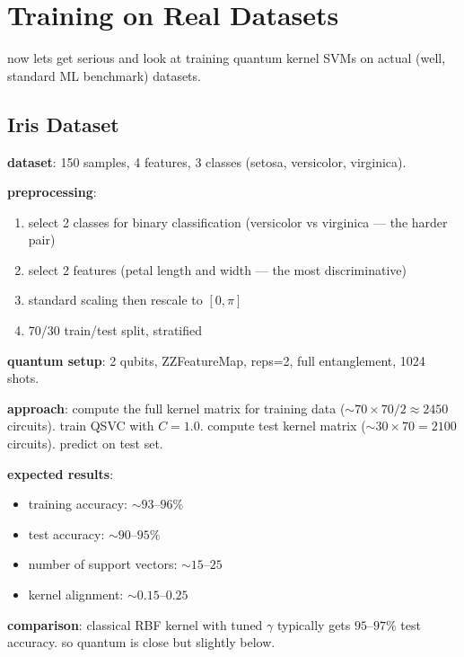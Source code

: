 \documentclass[11pt,a4paper]{article}
\theoremstyle{definition}
\theoremstyle{remark}
\begin{document}
\section{Training on Real Datasets}

now lets get serious and look at training quantum kernel SVMs on actual (well, standard ML benchmark) datasets.

\subsection{Iris Dataset}

\textbf{dataset}: 150 samples, 4 features, 3 classes (setosa, versicolor, virginica).

\textbf{preprocessing}:
\begin{enumerate}[leftmargin=*]
    \item select 2 classes for binary classification (versicolor vs virginica --- the harder pair)
    \item select 2 features (petal length and width --- the most discriminative)
    \item standard scaling then rescale to $[0, \pi]$
    \item 70/30 train/test split, stratified
\end{enumerate}

\textbf{quantum setup}: 2 qubits, ZZFeatureMap, reps=2, full entanglement, 1024 shots.

\textbf{approach}: compute the full kernel matrix for training data ($\sim 70 \times 70 / 2 \approx 2450$ circuits). train QSVC with $C = 1.0$. compute test kernel matrix ($\sim 30 \times 70 = 2100$ circuits). predict on test set.

\textbf{expected results}:
\begin{itemize}[leftmargin=*]
    \item training accuracy: $\sim 93$--$96\%$
    \item test accuracy: $\sim 90$--$95\%$
    \item number of support vectors: $\sim 15$--$25$
    \item kernel alignment: $\sim 0.15$--$0.25$
\end{itemize}

\textbf{comparison}: classical RBF kernel with tuned $\gamma$ typically gets $95$--$97\%$ test accuracy. so quantum is close but slightly below.
\end{document}
